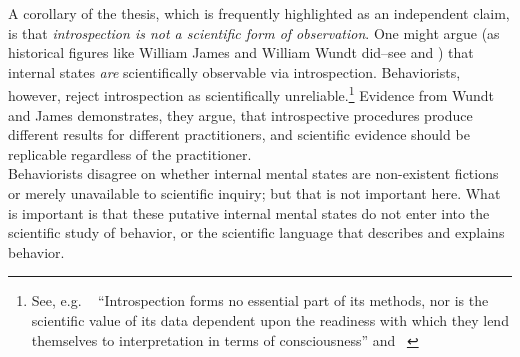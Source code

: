 \begin{refsection}
\begin{enumerate}
A corollary of the thesis, which is frequently highlighted as an independent claim, is that \emph{introspection is not a scientific form of observation}. One might argue (as historical figures like William James and William Wundt did–see  and ) that internal states \emph{are} scientifically observable via introspection. Behaviorists, however, reject introspection as scientifically unreliable.\footnote{See, e.g. ~\citep{Watson:1913tq} “Introspection forms no essential part of its methods, nor is the scientific value of its data dependent upon the readiness with which they lend themselves to interpretation in terms of consciousness” and ~\citep[p. 30]{Skinner:LehhdRQI}} Evidence from Wundt and James demonstrates, they argue, that introspective procedures produce different results for different practitioners, and scientific evidence should be replicable regardless of the practitioner.\\
Behaviorists disagree on whether internal mental states are non-existent fictions or merely unavailable to scientific inquiry; but that is not important here. What is important is that these putative internal mental states do not enter into the scientific study of behavior, or the scientific language that describes and explains behavior.


\end{enumerate}
\end{refsection}
